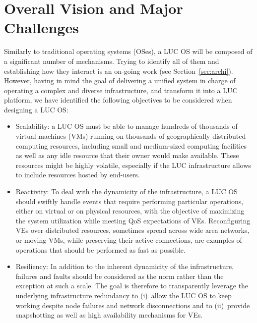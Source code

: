 \section{Overall Vision and Major Challenges\label{sec:challenges}}

Similarly to traditional operating systems (OSes), a LUC OS will be composed of a
significant number of mechanisms. Trying to identify all of them and establishing how they
interact is an on-going work (see Section~\ref{sec:archi}). However, having in
mind the goal of delivering a unified system in charge of operating a complex and diverse
infrastructure, and transform it into a LUC platform, we have identified the following
objectives to be considered when designing a LUC OS:

\begin{itemize} 
\item Scalability: a LUC OS must be able to manage hundreds of
  thousands of virtual machines (VMs) running on thousands of 
  geographically distributed computing resources, including small and
  medium-sized computing facilities as well as any idle resource that their owner would make available. These resources might be
  highly volatile, especially if the LUC infrastructure allows to include resources hosted by
  end-users.
\item Reactivity: To deal with the dynamicity of the infrastructure, a LUC OS
  should swiftly handle events that require performing particular
  operations, either on virtual or on physical resources, with the
  objective of maximizing the system utilization while meeting QoS expectations of VEs. 
  Reconfiguring  VEs over distributed resources, sometimes spread across wide area networks, or moving VMs, 
  while preserving their active connections, are examples of operations that should be performed as fast as possible.
\item Resiliency: In addition to the inherent dynamicity of the
  infrastructure, failures and faults should be considered as the norm rather than the
exception at such a scale. The goal is therefore to transparently leverage the
underlying infrastructure redundancy to (i)~allow the LUC OS to keep
working despite node failures and network disconnections and to (ii)~provide
snapshotting as well as high availability mechanisms for VEs.



\end{itemize}
